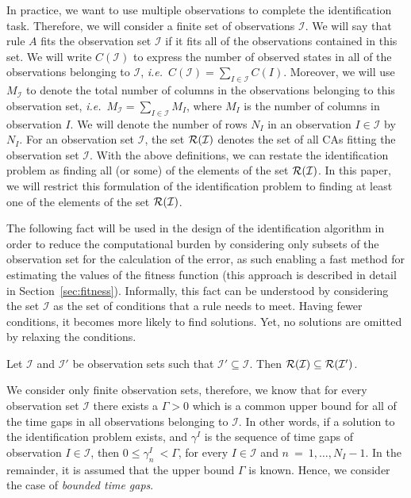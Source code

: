 In practice, we want to use multiple observations to complete the identification task. Therefore, we will consider a finite set of observations $\mathcal{I}$.
We will say that rule $A$ fits the observation set $\mathcal{I}$ if it fits all of the observations contained in this set. We will write $C(\mathcal{I})$ to express the number of observed states in all of the observations belonging to $\mathcal{I}$, \emph{i.e.}\ $C(\mathcal{I}) = \sum_{I\in\mathcal{I}} C(I)$. Moreover, we will use $M_\mathcal{I}$ to denote the total number of columns in the observations belonging to this observation set, \emph{i.e.}\ $M_\mathcal{I} = \sum_{I\in\mathcal{I}} M_I$, where $M_I$ is the number of columns in observation $I$. We will denote the number of rows $N_I$ in an observation $I\in\mathcal{I}$ by $N_I$. For an observation set $\mathcal{I}$, the set $\operatorname{\mathcal{R}}(\mathcal{I})$ denotes the set of all CAs fitting the observation set $\mathcal{I}$. With the above definitions,  we can restate the identification problem as finding all (or some) of the elements of the set $\operatorname{\mathcal{R}}(\mathcal{I})$. In this paper, we will restrict this formulation of the identification problem to finding at least one of the elements of the set $\operatorname{\mathcal{R}}(\mathcal{I})$.

The following fact will be used in the design of the identification algorithm in order to reduce the computational burden by considering only subsets of the observation set for the calculation of the error, as such enabling a fast method for estimating the values of the fitness function (this approach is described in detail in Section~\ref{sec:fitness}). Informally, this fact can be understood by considering the set $\mathcal{I}$ as the set of conditions that a rule needs to meet. Having fewer conditions, it becomes more likely to find solutions. Yet, no solutions are omitted by relaxing the conditions.

\begin{fact}
	Let $\mathcal{I}$ and $\mathcal{I}'$ be observation sets such that $\mathcal{I}'\subseteq \mathcal{I}$. Then $\operatorname{\mathcal{R}}(\mathcal{I})\subseteq\operatorname{\mathcal{R}}(\mathcal{I}')$.\label{fac:rules-set}
\end{fact}

We consider only finite observation sets, therefore, we know that for every observation set $\mathcal{I}$ there exists a $\Gamma>0$ which is a common upper bound for all of the time gaps in all observations belonging to $\mathcal{I}$. In other words, if a solution to the identification problem exists, and $\gamma^I$ is the sequence of time gaps of observation $I\in\mathcal{I}$, then $0\leq \gamma^I_n\ < \Gamma$, for every $I\in\mathcal{I}$ and $n~=~1,\dotsc,N_I-1$.
In the remainder, it is assumed that the upper bound $\Gamma$ is known. Hence, we consider the case of \emph{bounded time gaps}.

